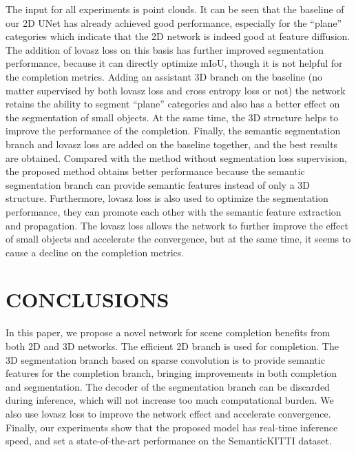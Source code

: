 \documentclass[letterpaper, 10 pt, conference]{ieeeconf}
\begin{document}
The input for all experiments is point clouds. It can be seen that the baseline of our 2D UNet has already achieved good performance, especially for the ``plane'' categories which indicate that the 2D network is indeed good at feature diffusion. The addition of lovasz loss on this basis has further improved segmentation performance, because it can directly optimize mIoU, though it is not helpful for the completion metrics. Adding an assistant 3D branch on the baseline (no matter supervised by both lovasz loss and cross entropy loss or not) the network retains the ability to segment ``plane'' categories and also has a better effect on the segmentation of small objects. At the same time, the 3D structure helps to improve the performance of the completion. Finally, the semantic segmentation branch and lovasz loss are added on the baseline together, and the best results are obtained. Compared with the method without segmentation loss supervision, the proposed method obtains better performance because the semantic segmentation branch can provide semantic features instead of only a 3D structure. Furthermore, lovasz loss is also used to optimize the segmentation performance, they can promote each other with the semantic feature extraction and propagation. The lovasz loss allows the network to further improve the effect of small objects and accelerate the convergence, but at the same time, it seems to cause a decline on the completion metrics. 

\section{CONCLUSIONS}

In this paper, we propose a novel network for scene completion benefits from both 2D and 3D networks. The efficient 2D branch is used for completion. The 3D segmentation branch based on sparse convolution is to provide semantic features for the completion branch, bringing improvements in both completion and segmentation. The decoder of the segmentation branch can be discarded during inference, which will not increase too much computational burden. We also use lovasz loss to improve the network effect and accelerate convergence. Finally, our experiments show that the proposed model has real-time inference speed, and set a state-of-the-art performance on the SemanticKITTI dataset.

\addtolength{\textheight}{-19.5cm}   







\end{document}
